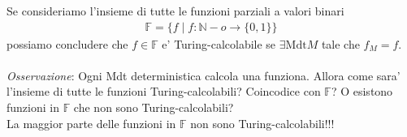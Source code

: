 \documentclass[a4paper,12pt]{article}
\begin{document}
{Se consideriamo l'insieme di tutte le funzioni parziali a valori binari
\begin{align*}
  \mathbb{F} = \{f \mid f : \mathbb{N} -o \to \{0,1\}\}
\end{align*}
possiamo concludere che $f \in \mathbb{F}$ e' Turing-calcolabile se $\exists \text{Mdt} M$ tale che $f_M = f$. \\
\vspace{1em} \\
\textit{Osservazione}: Ogni Mdt deterministica calcola una funziona. Allora come sara' l'insieme di tutte le funzioni Turing-calcolabili? Coincodice con $\mathbb{F}$? O esistono funzioni in $\mathbb{F}$ che non sono Turing-calcolabili? \\
La maggior parte delle funzioni in $\mathbb{F}$ non sono Turing-calcolabili!!! \\
\vspace{1em} \\
}
\end{document}
